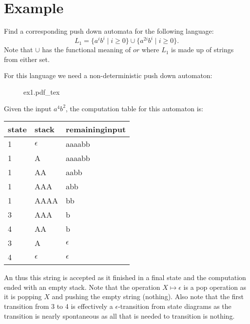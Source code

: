\documentclass[12pt]{book}
\title{\coursetitle\linebreak\lecturename}
\author{\\Cain Susko\\ 
           \\ \\ \\
      Queen's University 
    \\School of Computing\\}
\newcommand{\incfig}[1]{%
    {#1.pdf_tex}
}
\begin{document}
\begin{titlepage}
        \maketitle
\end{titlepage}


\section*{Example}
Find a corresponding push down automata for the following language:
\[
L_1 = \{a^i b^i  \mid i\geq 0\}\cup\{a^{2i} b^i  \mid  i\geq 0\}
.\] 
Note that $\cup$ has the functional meaning of $or$ where  $L_1$ is made up of strings from either set.

For this language we need a non-deterministic push down automaton:
\begin{figure}[h]
        \centering
        \incfig{ex1}
\end{figure}

Given the input $a^4 b^2$, the computation table for this automaton is:
\begin{table}[h]
\centering
\begin{tabular}{@{}lll@{}}
\toprule
state & stack      & remaining\;input \\ \midrule
1     & $\epsilon$ & aaaabb           \\
1     & A          & aaaabb           \\
1     & AA         & aabb             \\
1     & AAA        & abb              \\
1     & AAAA       & bb               \\
3     & AAA        & b                \\
4     & AA         & b                \\
3     & A          & $\epsilon$       \\
4     & $\epsilon$ & $\epsilon$       \\ \bottomrule
\end{tabular}
\end{table}

An thus this string is accepted as it finished in a final state and the computation ended with an empty stack.
Note that the operation $X\mapsto\epsilon$ is a pop operation as it is popping  $X$ and pushing the empty string (nothing). 
Also note that the first transition from 3 to 4 is effectively a $\epsilon$-transition from state diagrams as
        the transition is nearly spontaneous as all that is needed  to transition is nothing.
\end{document}
